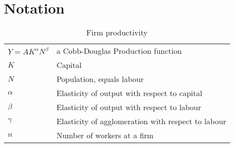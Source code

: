 \chapter{Notation}

\begin{longtable}{lp{10cm}}
\caption{Firm productivity}                       \\
\hline
$Y=A K^{\alpha }N^{\beta }$  &  a Cobb-Douglas Production function \\ %
$K$              &  Capital               \\ 
$N$              &  Population, equals labour \\ %
$\alpha$         &  Elasticity of output with respect to capital          \\
$\beta$          &  Elasticity of output with respect to labour           \\ %
$\gamma$         &  Elasticity of agglomeration with respect to labour    \\ %

$n$  &  Number of workers at a firm \\


\end{longtable}
